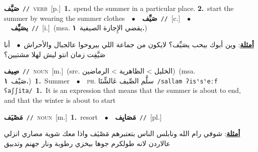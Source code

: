 \documentclass[10pt,a4paper,twoside]{article} %
\begin{document}
\begin{multicols}{2}
{\setlength\topsep{0pt}\textbf{\foreignlanguage{arabic}{صَيَّف}}\ {\color{gray}\texttt{//}\color{black}}\ \textsc{verb}\ [p.]\ \textbf{1.}~spend the summer in a particular place.  \textbf{2.}~start the summer by wearing the summer clothes\ \ $\bullet$\ \ \setlength\topsep{0pt}\textbf{\foreignlanguage{arabic}{صَيِّف}}\ {\color{gray}\texttt{//}\color{black}}\ [c.]\ \ $\bullet$\ \ \setlength\topsep{0pt}\textbf{\foreignlanguage{arabic}{يصَيِّف}}\ {\color{gray}\texttt{//}\color{black}}\ [i.]\ \color{gray}(msa. \foreignlanguage{arabic}{يقضي الإِجازة الصيفية}~\foreignlanguage{arabic}{\textbf{١.}})\color{black}\  \begin{flushright}\color{gray}\foreignlanguage{arabic}{\textbf{\underline{\foreignlanguage{arabic}{أمثلة}}}: وين أبوك بيحب يصَيِّف؟ لايكون من جماعة اللي بيروحوا عالجبال والأحراش\ $\bullet$\ \  أنا صَيَّفِت زمان انتو ليش لهلا مشتيين؟}\end{flushright}\color{black}} \vspace{2mm}

{\setlength\topsep{0pt}\textbf{\foreignlanguage{arabic}{صِيف}}\ {\color{gray}\texttt{//}\color{black}}\ \textsc{noun}\ [m.]\ (src. \color{gray}\foreignlanguage{arabic}{الخليل > الظاهرية > الرماضين}\color{black})\ \color{gray}(msa. \foreignlanguage{arabic}{صَيْف}~\foreignlanguage{arabic}{\textbf{١.}})\color{black}\ \textbf{1.}~Summer\ \ $\bullet$\ \ \textsc{ph.} \color{gray} \foreignlanguage{arabic}{سلَّم الصِّيف عَالشِّتَا}\color{black}\ {\color{gray}\texttt{/{\sffamily sallam ʔisˤsˤeːf ʕaʃʃita}/}\color{black}}\ \textbf{1.}~It is an expression that means that the summer is about to end, and that the winter is about to start\ } \vspace{2mm}

{\setlength\topsep{0pt}\textbf{\foreignlanguage{arabic}{مَصْيَف}}\ {\color{gray}\texttt{//}\color{black}}\ \textsc{noun}\ [m.]\ \textbf{1.}~resort\ \ $\bullet$\ \ \setlength\topsep{0pt}\textbf{\foreignlanguage{arabic}{مَصَايِف}}\ {\color{gray}\texttt{//}\color{black}}\ [pl.]\  \begin{flushright}\color{gray}\foreignlanguage{arabic}{\textbf{\underline{\foreignlanguage{arabic}{أمثلة}}}: شوفي رام الله ونابلس الناس بتعتبرهم مَصْيَف واذا معك شوية مصاري انزلي عالاردن لانه طولكرم جوها بيخزي رطوبة ونار جهنم وتدبيق}\end{flushright}\color{black}} \vspace{2mm}


\end{multicols}
\end{document}
